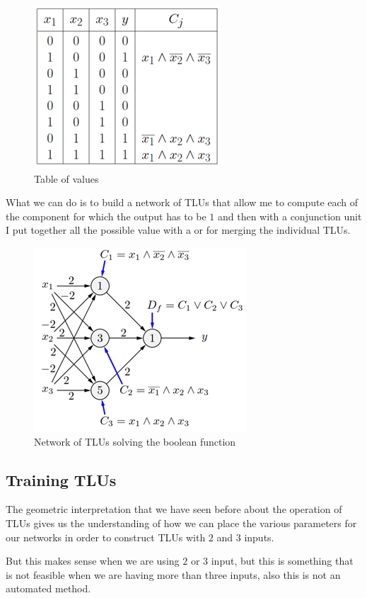 \documentclass{article}
\begin{document}
\begin{figure}[H]
    \includegraphics[scale=1.0]{images/arb_bool_funcs.png}
    \centering
    \caption{Table of values}
\end{figure}

What we can do is to build a network of TLUs that allow me to compute each of the component
for which the output has to be $1$ and then with a conjunction unit I put together all
the possible value with a or for merging the individual TLUs.

\begin{figure}[H]
    \includegraphics[scale=1]{images/arb_bool_funcs_graph.png}
    \centering
    \caption{Network of TLUs solving the boolean function}
\end{figure}


\subsection{Training TLUs}
The geometric interpretation that we have seen before about the operation of TLUs gives us the
understanding of how we can place the various parameters for our networks in order to
construct TLUs with $2$ and $3$ inputs.

But this makes sense when we are using $2$ or $3$ input, but this is something that is not
feasible when we are having more than three inputs, also this is not an automated method.
\end{document}
